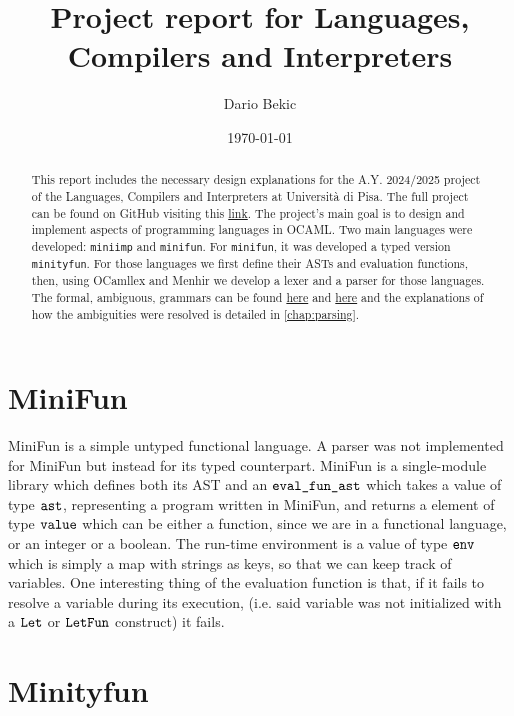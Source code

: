 \documentclass[a4paper,11pt]{report}
\title{Project report for Languages, Compilers and Interpreters}
\author{Dario Bekic}
\date{\today}
\begin{document}
\maketitle
\tableofcontents

\begin{abstract}
This report includes the necessary design explanations for the A.Y. 2024/2025 project of the Languages, Compilers and Interpreters at Università di Pisa.
The full project can be found on GitHub visiting this \href{https://github.com/wuacs/unipi-lci/tree/main/project}{link}.
The project's main goal is to design and implement aspects of programming languages in OCAML. Two main languages were developed: \verb|miniimp| and \verb|minifun|. For \verb|minifun|, it was developed a typed version \verb|minityfun|. For those languages we first define their ASTs and evaluation functions, then, using OCamllex and Menhir we develop a lexer and a parser for those languages. The formal, ambiguous, grammars can be found \href{https://lceragioli.github.io/pages/Slides/semantics.pdf}{here} and \href{https://lceragioli.github.io/pages/Slides/types.pdf}{here} and the explanations of how the ambiguities were resolved is detailed in \autoref{chap:parsing}.
\end{abstract}

\section{MiniFun}
\label{Section::MiniFun}

MiniFun is a simple untyped functional language. A parser was not implemented for MiniFun but instead for its typed counterpart. MiniFun is a single-module library which defines both its AST and an $\verb|eval_fun_ast|$ which takes a value of type $\verb|ast|$, representing a program written in MiniFun, and returns a element of type $\verb|value|$ which can be either a function, since we are in a functional language, or an integer or a boolean.
The run-time environment is a value of type $\verb|env|$ which is simply a map with strings as keys, so that we can keep track of variables.
One interesting thing of the evaluation function is that, if it fails to resolve a variable during its execution, (i.e. said variable was not initialized with a $\verb|Let|$ or $\verb|LetFun|$ construct) it fails.
 

\section{Minityfun}
\end{document}
